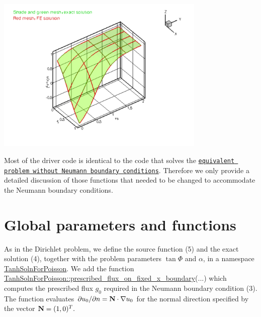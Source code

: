  
\begin{DoxyImage}
\includegraphics[width=0.75\textwidth]{soln}
\end{DoxyImage}


Most of the driver code is identical to the code that solves the \href{../../../poisson/two_d_poisson/html/index.html}{\tt equivalent problem without Neumann boundary conditions}. Therefore we only provide a detailed discussion of those functions that needed to be changed to accommodate the Neumann boundary conditions.



 

\hypertarget{index_global}{}\section{Global parameters and functions}\label{index_global}
As in the Dirichlet problem, we define the source function (5) and the exact solution (4), together with the problem parameters $ \tan \Phi $ and $ \alpha $, in a namespace {\ttfamily \hyperlink{namespaceTanhSolnForPoisson}{Tanh\+Soln\+For\+Poisson}}. We add the function {\ttfamily \hyperlink{namespaceTanhSolnForPoisson_a0e99ccf27df36f28f091de6d57484172}{Tanh\+Soln\+For\+Poisson\+::prescribed\+\_\+flux\+\_\+on\+\_\+fixed\+\_\+x\+\_\+boundary}}(...) which computes the prescribed flux $ g_0 $ required in the Neumann boundary condition (3). The function evaluates $ \partial u_0 /\partial n = {\bf N} \cdot \nabla u_0 $ for the normal direction specified by the vector $ {\bf N} = (1,0)^T. $

